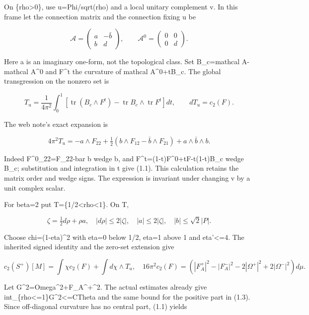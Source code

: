 \documentclass[
  10pt,
]{article}
\begin{document}
On \{rho\textgreater0\}, use u=Phi/sqrt(rho) and a local unitary
complement v. In this frame let the connection matrix and the connection
fixing u be

\[
 \mathcal A=\begin{pmatrix}a&-\bar b\\b&d\end{pmatrix},
 \qquad \mathcal A^0=\begin{pmatrix}0&0\\0&d\end{pmatrix}.
\]

Here a is an imaginary one-form, not the topological class. Set
B\_c=mathcal A-mathcal A\^{}0 and F\^{}t the curvature of mathcal
A\^{}0+tB\_c. The global transgression on the nonzero set is

\[
 T_u=\frac1{4\pi^2}\int_0^1
 [\operatorname{tr}(B_c\wedge F^t)
       -\operatorname{tr}B_c\wedge\operatorname{tr}F^t]dt,
 \qquad dT_u=c_2(F).
\]

The web note's exact expansion is

\[
 4\pi^2T_u=-a\wedge F_{22}
 +\tfrac12(b\wedge F_{12}-\bar b\wedge F_{21})
 +a\wedge\bar b\wedge b.                         \tag{1.1}
\]

Indeed F\^{}0\_22=F\_22-bar b wedge b, and
F\^{}t=(1-t)F\^{}0+tF-t(1-t)B\_c wedge B\_c; substitution and
integration in t give (1.1). This calculation retains the matrix order
and wedge signs. The expression is invariant under changing v by a unit
complex scalar.

For beta=2 put T=\{1/2\textless rho\textless1\}. On T,

\[
 \zeta=\tfrac12d\rho+\rho a,\quad
 |d\rho|\le2|\zeta|,\quad |a|\le2|\zeta|,
 \quad |b|\le\sqrt2|P|.                             \tag{1.2}
\]

Choose chi=(1-eta)\^{}2 with eta=0 below 1/2, eta=1 above 1 and
\textbar eta'\textbar\textless=4. The inherited signed identity and the
zero-set extension give

\[
 c_2(S^+)[M]=\int\chi c_2(F)+\int d\chi\wedge T_u,
 \quad
 16\pi^2c_2(F)=
 (|F_A^+|^2-|F_A^-|^2-2|\Omega^+|^2+2|\Omega^-|^2)d\mu.
                                                               \tag{1.3}
\]

Let G\^{}2=\textbar Omega\textbar\^{}2+\textbar F\_A\^{}+\textbar\^{}2.
The actual estimates already give
int\_\{rho\textless=1\}G\^{}2\textless=CTheta and the same bound for the
positive part in (1.3). Since off-diagonal curvature has no central
part, (1.1) yields
\end{document}
